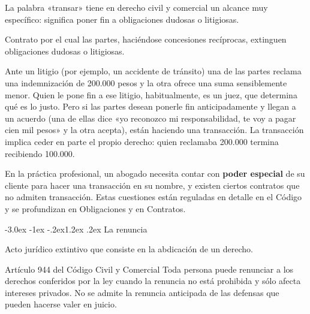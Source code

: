 \documentclass[12pt,oneside]{book}
\makeatletter
\renewcommand\section{\@startsection{section}{1}{\z@}%
  {-3.0ex \@plus -1ex \@minus -.2ex}{1.2ex \@plus .2ex}%
  {\normalfont\large\bfseries\color{acento}}}
\makeatother
\begin{document}
La palabra «transar» tiene en derecho civil y comercial un alcance muy específico: significa poner fin a obligaciones dudosas o litigiosas.

\begin{definicion}[{Transacción}]
Contrato por el cual las partes, haciéndose concesiones recíprocas, extinguen obligaciones dudosas o litigiosas.
\end{definicion}

\begin{ejemplo}
Ante un litigio (por ejemplo, un accidente de tránsito) una de las partes reclama una indemnización de 200.000 pesos y la otra ofrece una suma sensiblemente menor. Quien le pone fin a ese litigio, habitualmente, es un juez, que determina qué es lo justo. Pero si las partes desean ponerle fin anticipadamente y llegan a un acuerdo (una de ellas dice «yo reconozco mi responsabilidad, te voy a pagar cien mil pesos» y la otra acepta), están haciendo una transacción. La transacción implica ceder en parte el propio derecho: quien reclamaba 200.000 termina recibiendo 100.000.
\end{ejemplo}

En la práctica profesional, un abogado necesita contar con \textbf{poder especial} de su cliente para hacer una transacción en su nombre, y existen ciertos contratos que no admiten transacción. Estas cuestiones están reguladas en detalle en el Código y se profundizan en Obligaciones y en Contratos.

\section{La renuncia}

\begin{definicion}[{Renuncia}]
Acto jurídico extintivo que consiste en la abdicación de un derecho.
\end{definicion}

\begin{articulo}{Artículo 944 del Código Civil y Comercial}
Toda persona puede renunciar a los derechos conferidos por la ley cuando la renuncia no está prohibida y sólo afecta intereses privados. No se admite la renuncia anticipada de las defensas que pueden hacerse valer en juicio.
\end{articulo}
\end{document}
